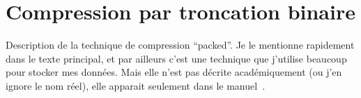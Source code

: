 
\section{Compression par troncation binaire}
\label{ax:compression-troncation}

Description de la technique de compression \enquote{packed}.
Je le mentionne rapidement dans le texte principal, et par ailleurs c'est une technique que j'utilise beaucoup pour stocker mes données.
Mais elle n'est pas décrite académiquement (ou j'en ignore le nom réel), elle apparait seulement dans le manuel~.

